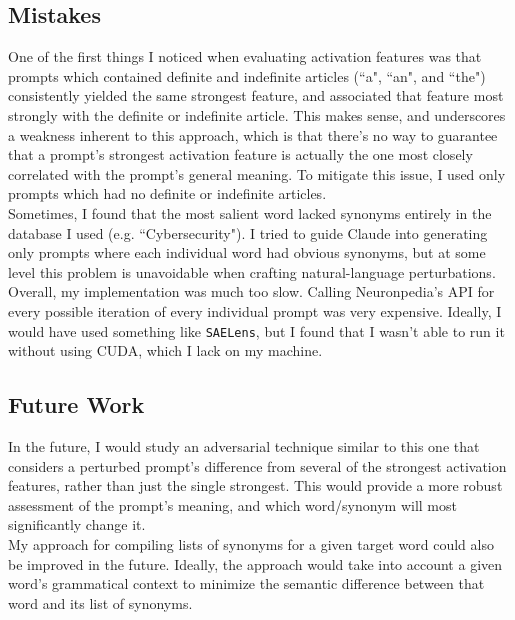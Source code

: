 \documentclass{article}
\begin{document}
\subsection*{Mistakes}

One of the first things I noticed when evaluating activation features was that prompts which contained definite and indefinite articles (``a", ``an", and ``the") consistently yielded the same strongest feature, and associated that feature most strongly with the definite or indefinite article. This makes sense, and underscores a weakness inherent to this approach, which is that there's no way to guarantee that a prompt's strongest activation feature is actually the one most closely correlated with the prompt's general meaning. To mitigate this issue, I used only prompts which had no definite or indefinite articles. \\ 

Sometimes, I found that the most salient word lacked synonyms entirely in the database I used (e.g. ``Cybersecurity"). I tried to guide Claude into generating only prompts where each individual word had obvious synonyms, but at some level this problem is unavoidable when crafting natural-language perturbations. \\

Overall, my implementation was much too slow. Calling Neuronpedia's API for every possible iteration of every individual prompt was very expensive. Ideally, I would have used something like \texttt{SAELens}, but I found that I wasn't able to run it without using CUDA, which I lack on my machine.

\subsection*{Future Work}

In the future, I would study an adversarial technique similar to this one that considers a perturbed prompt's difference from several of the strongest activation features, rather than just the single strongest. This would provide a more robust assessment of the prompt's meaning, and which word/synonym will most significantly change it. \\ 

My approach for compiling lists of synonyms for a given target word could also be improved in the future. Ideally, the approach would take into account a given word's grammatical context to minimize the semantic difference between that word and its list of synonyms. \\
\end{document}
